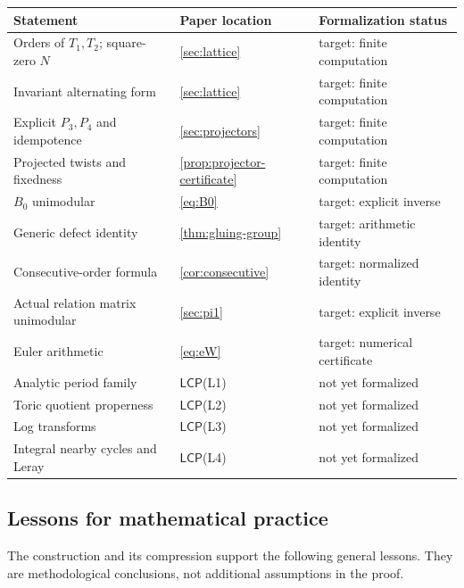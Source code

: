\documentclass[11pt,reqno]{amsart}
\numberwithin{equation}{section}
\newcommand{\LCP}{\mathsf{LCP}}
\theoremstyle{definition}
\begin{document}
\begin{center}
\small
\begin{tabularx}{\textwidth}{@{}X>{\raggedright\arraybackslash}p{}>{\raggedright\arraybackslash}p{}@{}}
\toprule
Statement & Paper location & Formalization status\\
\midrule
Orders of $T_1,T_2$; square-zero $N$ & \cref{sec:lattice} & target: finite computation\\
Invariant alternating form & \cref{sec:lattice} & target: finite computation\\
Explicit $P_3,P_4$ and idempotence & \cref{sec:projectors} & target: finite computation\\
Projected twists and fixedness & \cref{prop:projector-certificate} & target: finite computation\\
$B_0$ unimodular & \cref{eq:B0} & target: explicit inverse\\
Generic defect identity & \cref{thm:gluing-group} & target: arithmetic identity\\
Consecutive-order formula & \cref{cor:consecutive} & target: normalized identity\\
Actual relation matrix unimodular & \cref{sec:pi1} & target: explicit inverse\\
Euler arithmetic & \cref{eq:eW} & target: numerical certificate\\
Analytic period family & $\LCP$(L1) & not yet formalized\\
Toric quotient properness & $\LCP$(L2) & not yet formalized\\
Log transforms & $\LCP$(L3) & not yet formalized\\
Integral nearby cycles and Leray & $\LCP$(L4) & not yet formalized\\
\bottomrule
\end{tabularx}
\end{center}


\subsection{Lessons for mathematical practice}\label{sec:lessons}

The construction and its compression support the following general lessons. They are methodological conclusions, not additional assumptions in the proof.
\end{document}
